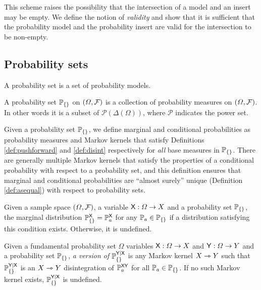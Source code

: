 This scheme raises the possibility that the intersection of a model and an insert may be empty. We define the notion of \emph{validity} and show that it is sufficient that the probability model and the probability insert are valid for the intersection to be non-empty.

\subsection{Probability sets}

A probability set is a set of probability models.

\begin{definition}
A probability set $\mathbb{P}_{\{\}}$ on $(\Omega,\mathcal{F})$ is a collection of probability measures on $(\Omega,\mathcal{F})$. In other words it is a subset of $\mathscr{P}(\Delta(\Omega))$, where $\mathscr{P}$ indicates the power set.
\end{definition}

Given a probability set $\mathbb{P}_{\{\}}$, we define marginal and conditional probabilities as probability measures and Markov kernels that satisfy Definitions \ref{def:pushforward} and \ref{def:disint} respectively for \emph{all} base measures in $\mathbb{P}_{\{\}}$. There are generally multiple Markov kernels that satisfy the properties of a conditional probability with respect to a probability set, and this definition ensures that marginal and conditional probabilities are ``almost surely'' unique (Definition \ref{def:asequal}) with respect to probability sets.

\begin{definition}
Given a sample space $(\Omega,\mathcal{F})$, a variable $\mathsf{X}:\Omega\to X$ and a probability set $\mathbb{P}_{\{\}}$, the marginal distribution $\mathbb{P}_{\{\}}^{\mathsf{X}}=\mathbb{P}_a^{\mathsf{X}}$ for any $\mathbb{P}_a\in\mathbb{P}_{\{\}}$ if a distribution satisfying this condition exists. Otherwise, it is undefined.
\end{definition}

\begin{definition}
Given a fundamental probability set $\Omega$ variables $\mathsf{X}:\Omega\to X$ and $\mathsf{Y}:\Omega\to Y$ and a probability set $\mathbb{P}_{\{\}}$, \emph{a version of} $\mathbb{P}_{\{\}}^{\mathsf{Y}|\mathsf{X}}$ is any Markov kernel $X\rightarrowtriangle Y$ such that $\mathbb{P}_{\{\}}^{\mathsf{Y}|\mathsf{X}}$ is an $X\rightarrowtriangle Y$ disintegration of $\mathbb{P}_a^{\mathsf{XY}}$ for all $\mathbb{P}_a\in \mathbb{P}_{\{\}}$. If no such Markov kernel exists, $\mathbb{P}_{\{\}}^{\mathsf{Y}|\mathsf{X}}$ is undefined.
\end{definition}

